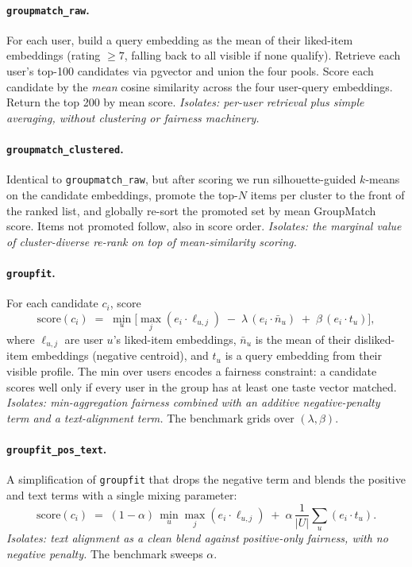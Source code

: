 \documentclass[11pt]{article}
\begin{document}
\paragraph{\texttt{groupmatch\_raw}.}
For each user, build a query embedding as the mean of their liked-item
embeddings (rating $\geq 7$, falling back to all visible if none
qualify). Retrieve each user's top-100 candidates via pgvector and union
the four pools. Score each candidate by the \emph{mean} cosine
similarity across the four user-query embeddings. Return the top 200 by
mean score. \emph{Isolates: per-user retrieval plus simple averaging,
without clustering or fairness machinery.}

\paragraph{\texttt{groupmatch\_clustered}.}
Identical to \texttt{groupmatch\_raw}, but after scoring we run
silhouette-guided $k$-means on the candidate embeddings, promote the
top-$N$ items per cluster to the front of the ranked list, and globally
re-sort the promoted set by mean GroupMatch score. Items not promoted
follow, also in score order. \emph{Isolates: the marginal value of
cluster-diverse re-rank on top of mean-similarity scoring.}

\paragraph{\texttt{groupfit}.}
For each candidate $c_i$, score
\[
\mathrm{score}(c_i) \;=\; \min_{u} \Big[ \max_{j} (e_i \cdot \ell_{u,j})
\;-\; \lambda\, (e_i \cdot \bar n_u)
\;+\; \beta\, (e_i \cdot t_u) \Big],
\]
where $\ell_{u,j}$ are user $u$'s liked-item embeddings, $\bar n_u$ is
the mean of their disliked-item embeddings (negative centroid), and $t_u$
is a query embedding from their visible profile. The min over users
encodes a fairness constraint: a candidate scores well only if every user
in the group has at least one taste vector matched. \emph{Isolates: min-aggregation
fairness combined with an additive negative-penalty term and a text-alignment
term.} The benchmark grids over $(\lambda, \beta)$.

\paragraph{\texttt{groupfit\_pos\_text}.}
A simplification of \texttt{groupfit} that drops the negative term and
blends the positive and text terms with a single mixing parameter:
\[
\mathrm{score}(c_i) \;=\; (1 - \alpha)\, \min_{u} \max_{j} (e_i \cdot \ell_{u,j})
\;+\; \alpha\, \frac{1}{|U|} \sum_{u} (e_i \cdot t_u).
\]
\emph{Isolates: text alignment as a clean blend against positive-only
fairness, with no negative penalty.} The benchmark sweeps $\alpha$.
\end{document}
